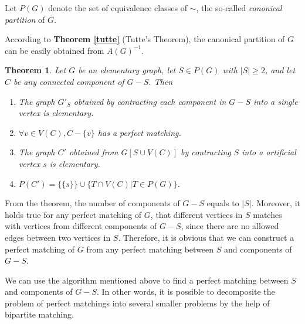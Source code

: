 \documentclass[a4paper]{article}
\newtheorem{theorem}{\hspace{2em}Theorem}
\begin{document}
				Let $P(G)$ denote the set of equivalence classes of $\sim$, the so-called \emph{canonical partition} of $G$.

				According to {\bfseries Theorem \ref{tutte}} (Tutte's Theorem), the canonical partition of $G$ can be easily obtained from $A(G)^{-1}$.

				\begin{theorem}
					Let $G$ be an elementary graph, let $S \in P(G)$ with $|S| \ge 2$, and let $C$ be any connected component of $G - S$. Then

					\begin{enumerate}
						\item The graph $G'_S$ obtained by contracting each component in $G - S$ into a single vertex is elementary.
						\item $\forall v \in V(C), C - \{v\}$ has a perfect matching.
						\item The graph $C'$ obtained from $G[S \cup V(C)]$ by contracting $S$ into a artificial vertex $s$ is elementary.
						\item $P(C') = \{\{s\}\} \cup \{T \cap V(C) | T \in P(G)\}$.
					\end{enumerate}

					\label{canonical}
				\end{theorem}

				From the theorem, the number of components of $G - S$ equals to $|S|$. Moreover, it holds true for any perfect matching of $G$, that different vertices in $S$ matches with vertices from different components of $G - S$, since there are no allowed edges between two vertices in $S$. Therefore, it is obvious that we can construct a perfect matching of $G$ from any perfect matching between $S$ and components of $G - S$.

				We can use the algorithm mentioned above to find a perfect matching between $S$ and components of $G - S$. In other words, it is possible to decomposite the problem of perfect matchings into several smaller problems by the help of bipartite matching.
\end{document}
